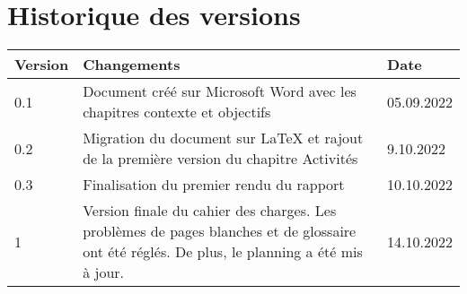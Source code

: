\chapter{Historique des versions}
\label{chap:versions}

\begin{tabular}{|m{}|m{}|m{}|} 
 \hline
 \textbf{Version} & \textbf{Changements} & \textbf{Date} \\ [0.5ex] 
 \hline
 0.1 & Document créé sur Microsoft Word avec les chapitres contexte et objectifs & 05.09.2022  \\ 
 \hline
 0.2 & Migration du document sur LaTeX et rajout de la première version du chapitre Activités & 9.10.2022  \\
 \hline
 0.3 & Finalisation du premier rendu du rapport & 10.10.2022  \\
 \hline
 1 & Version finale du cahier des charges. Les problèmes de pages blanches et de glossaire ont été réglés. De plus, le planning a été mis à jour. & 14.10.2022  \\
 \hline
\end{tabular}
